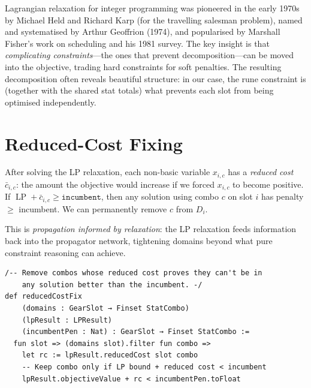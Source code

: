 \documentclass[11pt, a4paper, oneside]{book}
\newcommand{\LP}{\operatorname{LP}}
\begin{document}
\begin{histbox}
Lagrangian relaxation for integer programming was pioneered in the early
1970s by Michael Held and Richard Karp (for the travelling salesman problem),
named and systematised by Arthur Geoffrion (1974), and popularised by Marshall
Fisher's work on scheduling and his 1981 survey.  The key insight
is that \emph{complicating constraints}---the ones that prevent
decomposition---can be moved into the objective, trading hard constraints
for soft penalties.  The resulting decomposition often reveals beautiful
structure: in our case, the rune constraint is (together with the shared stat
totals) what prevents each slot from being optimised independently.
\end{histbox}

\section{Reduced-Cost Fixing}\label{sec:reduced}

\begin{defbox}[title={Reduced-Cost Fixing}]
After solving the LP relaxation, each non-basic variable $x_{i,c}$ has a
\emph{reduced cost} $\bar{c}_{i,c}$: the amount the objective would increase
if we forced $x_{i,c}$ to become positive.  If $\LP + \bar{c}_{i,c} \geq
\texttt{incumbent}$, then any solution using combo $c$ on slot $i$ has penalty
$\geq$ incumbent.  We can permanently remove $c$ from $D_i$.
\end{defbox}

This is \emph{propagation informed by relaxation}: the LP relaxation feeds
information back into the propagator network, tightening domains beyond what
pure constraint reasoning can achieve.

\begin{leanbox}[title={Lean 4 (Mathlib) --- Reduced-Cost Fixing}]
\begin{verbatim}
/-- Remove combos whose reduced cost proves they can't be in
    any solution better than the incumbent. -/
def reducedCostFix
    (domains : GearSlot → Finset StatCombo)
    (lpResult : LPResult)
    (incumbentPen : Nat) : GearSlot → Finset StatCombo :=
  fun slot => (domains slot).filter fun combo =>
    let rc := lpResult.reducedCost slot combo
    -- Keep combo only if LP bound + reduced cost < incumbent
    lpResult.objectiveValue + rc < incumbentPen.toFloat
\end{verbatim}
\end{leanbox}
\end{document}
